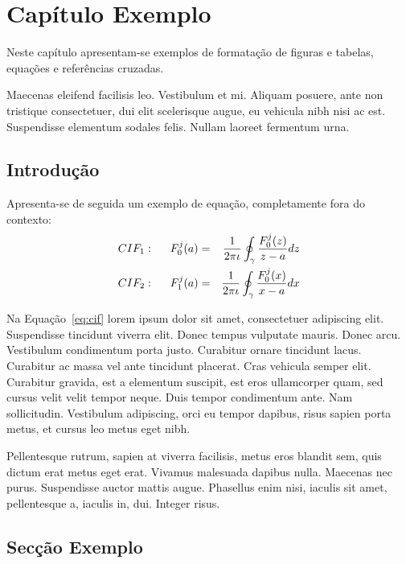 \chapter{Capítulo Exemplo}\label{chap:chap3}

Neste capítulo apresentam-se exemplos de formatação de figuras e
tabelas, equações e referências cruzadas.

Maecenas eleifend facilisis leo. Vestibulum et
mi. Aliquam posuere, ante non tristique consectetuer, dui elit
scelerisque augue, eu vehicula nibh nisi ac est. 
Suspendisse elementum sodales felis. Nullam laoreet fermentum urna. 

\section{Introdução}

Apresenta-se de seguida um exemplo de equação, completamente fora do contexto:
\begin{eqnarray}
CIF_1: \hspace*{5mm}F_0^j(a) &=& \frac{1}{2\pi \iota} \oint_{\gamma} \frac{F_0^j(z)}{z - a} dz\\
CIF_2: \hspace*{5mm}F_1^j(a) &=& \frac{1}{2\pi \iota} \oint_{\gamma} \frac{F_0^j(x)}{x - a} dx \label{eq:cif}
\end{eqnarray}

Na Equação~\ref{eq:cif} lorem ipsum dolor sit amet, consectetuer
adipiscing elit. Suspendisse tincidunt viverra elit. Donec tempus
vulputate mauris. Donec arcu. Vestibulum condimentum porta
justo. Curabitur ornare tincidunt lacus. Curabitur ac massa vel ante
tincidunt placerat. Cras vehicula semper elit. Curabitur gravida, est
a elementum suscipit, est eros ullamcorper quam, sed cursus velit
velit tempor neque. Duis tempor condimentum ante. Nam
sollicitudin. Vestibulum adipiscing, orci eu tempor dapibus, risus
sapien porta metus, et cursus leo metus eget nibh. 

Pellentesque rutrum, sapien at viverra facilisis, metus eros blandit
sem, quis dictum erat metus eget erat. Vivamus malesuada dapibus
nulla. Maecenas nec purus. Suspendisse auctor mattis augue. Phasellus
enim nisi, iaculis sit amet, pellentesque a, iaculis in, dui. Integer
risus. 

\section{Secção Exemplo}

